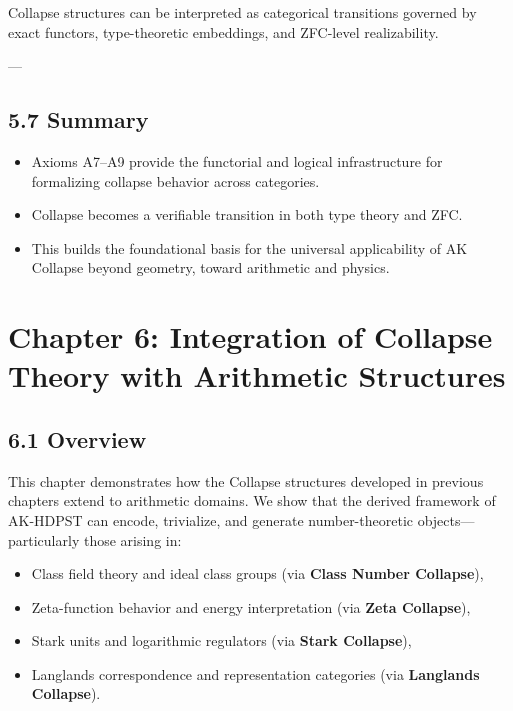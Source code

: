 \documentclass[11pt]{article}
\begin{document}
Collapse structures can be interpreted as categorical transitions governed by exact functors,  
type-theoretic embeddings, and ZFC-level realizability.

---

\subsection*{5.7 Summary}

\begin{itemize}
  \item Axioms A7–A9 provide the functorial and logical infrastructure  
  for formalizing collapse behavior across categories.
  \item Collapse becomes a verifiable transition in both type theory and ZFC.
  \item This builds the foundational basis for the universal applicability  
  of AK Collapse beyond geometry, toward arithmetic and physics.
\end{itemize}



\section*{Chapter 6: Integration of Collapse Theory with Arithmetic Structures}

\subsection*{6.1 Overview}

This chapter demonstrates how the Collapse structures developed in previous chapters extend to arithmetic domains.  
We show that the derived framework of AK-HDPST can encode, trivialize, and generate number-theoretic objects—particularly those arising in:

\begin{itemize}
  \item Class field theory and ideal class groups (via \textbf{Class Number Collapse}),
  \item Zeta-function behavior and energy interpretation (via \textbf{Zeta Collapse}),
  \item Stark units and logarithmic regulators (via \textbf{Stark Collapse}),
  \item Langlands correspondence and representation categories (via \textbf{Langlands Collapse}).
\end{itemize}
\end{document}
